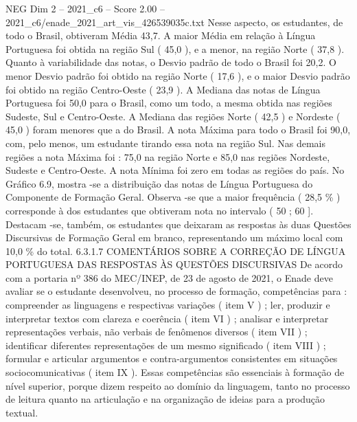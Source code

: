 \begin{textsample}{NEG Dim 2 – 2021\_c6 – Score 2.00 – 2021\_c6/enade\_2021\_art\_vis\_426539035c.txt}
Nesse aspecto, os estudantes, de todo o Brasil, obtiveram Média 43,7.
A maior Média em relação à Língua Portuguesa foi obtida na região Sul ( 45,0 ), e a menor, na região Norte ( 37,8 ).
Quanto à variabilidade das notas, o Desvio padrão de todo o Brasil foi 20,2.
O menor Desvio padrão foi obtido na região Norte ( 17,6 ), e o maior Desvio padrão foi obtido na região Centro-Oeste ( 23,9 ).
A Mediana das notas de Língua Portuguesa foi 50,0 para o Brasil, como um todo, a mesma obtida nas regiões Sudeste, Sul e Centro-Oeste.
A Mediana das regiões Norte ( 42,5 ) e Nordeste ( 45,0 ) foram menores que a do Brasil.
A nota Máxima para todo o Brasil foi 90,0, com, pelo menos, um estudante tirando essa nota na região Sul.
Nas demais regiões a nota Máxima foi : 75,0 na região Norte e 85,0 nas regiões Nordeste, Sudeste e Centro-Oeste.
A nota Mínima foi zero em todas as regiões do país.
No Gráfico 6.9, mostra -se a distribuição das notas de Língua Portuguesa do Componente de Formação Geral.
Observa -se que a maior frequência ( 28,5 \% ) corresponde à dos estudantes que obtiveram nota no intervalo ( 50 ; 60 ].
Destacam -se, também, os estudantes que deixaram as respostas às duas Questões Discursivas de Formação Geral em branco, representando um máximo local com 10,0 \% do total. 6.3.1.7 COMENTÁRIOS SOBRE A CORREÇÃO DE LÍNGUA PORTUGUESA DAS RESPOSTAS ÀS QUESTÕES DISCURSIVAS De acordo com a portaria nº 386 do MEC/INEP, de 23 de agosto de 2021, o Enade deve avaliar se o estudante desenvolveu, no processo de formação, competências para : compreender as linguagens e respectivas variações ( item V ) ; ler, produzir e interpretar textos com clareza e coerência ( item VI ) ; analisar e interpretar representações verbais, não verbais de fenômenos diversos ( item VII ) ; identificar diferentes representações de um mesmo significado ( item VIII ) ; formular e articular argumentos e contra-argumentos consistentes em situações sociocomunicativas ( item IX ).
Essas competências são essenciais à formação de nível superior, porque dizem respeito ao domínio da linguagem, tanto no processo de leitura quanto na articulação e na organização de ideias para a produção textual.

\end{textsample}
